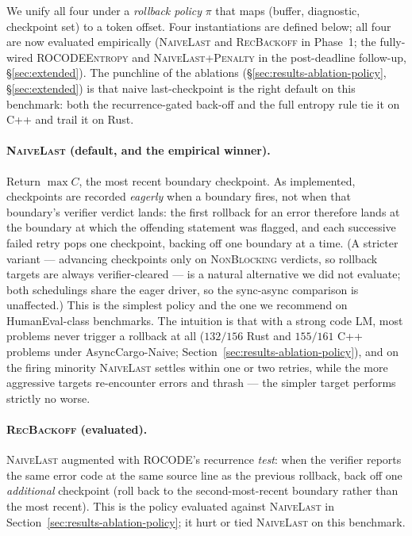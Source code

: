 We unify all four under a \emph{rollback policy} $\pi$ that maps
(buffer, diagnostic, checkpoint set) to a token offset. Four
instantiations are defined below; all four are now evaluated
empirically (\textsc{NaiveLast} and \textsc{RecBackoff} in
Phase~1; the fully-wired \textsc{ROCODEEntropy} and
\textsc{NaiveLast+Penalty} in the post-deadline follow-up,
\S\ref{sec:extended}). The punchline of
the ablations (\S\ref{sec:results-ablation-policy},
\S\ref{sec:extended}) is that
naive last-checkpoint is the right default on this benchmark:
both the recurrence-gated back-off and the full entropy rule tie
it on C++ and trail it on Rust.

\paragraph{\textsc{NaiveLast} (default, and the empirical winner).}
Return $\max C$, the most recent boundary checkpoint. As
implemented, checkpoints are recorded \emph{eagerly} when a
boundary fires, not when that boundary's verifier verdict lands:
the first rollback for an error therefore lands at the boundary at
which the offending statement was flagged, and each successive
failed retry pops one checkpoint, backing off one boundary at a
time. (A stricter variant --- advancing checkpoints only on
\textsc{NonBlocking} verdicts, so rollback targets are always
verifier-cleared --- is a natural alternative we did not evaluate;
both schedulings share the eager driver, so the sync-async
comparison is unaffected.) This is the simplest policy and the one
we recommend on HumanEval-class benchmarks. The intuition is that with a strong code LM, most
problems never trigger a rollback at all ($132/156$ Rust and
$155/161$ C++ problems under AsyncCargo-Naive;
Section~\ref{sec:results-ablation-policy}), and on the firing
minority \textsc{NaiveLast} settles within one or two retries,
while the more aggressive targets re-encounter errors and thrash
--- the simpler target performs strictly no worse.

\paragraph{\textsc{RecBackoff} (evaluated).} \textsc{NaiveLast}
augmented with ROCODE's recurrence \emph{test}: when the verifier
reports the same error code at the same source line as the previous
rollback, back off one \emph{additional} checkpoint (roll back to
the second-most-recent boundary rather than the most recent).
This is the policy evaluated against \textsc{NaiveLast} in
Section~\ref{sec:results-ablation-policy}; it hurt or tied
\textsc{NaiveLast} on this benchmark.

